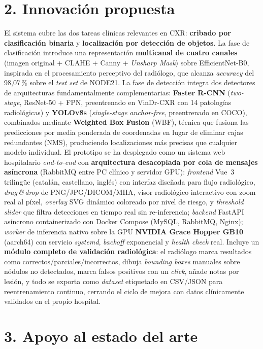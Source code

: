 \documentclass[11pt,a4paper]{article}
\begin{document}
\section*{2. Innovación propuesta}

El sistema cubre las dos tareas clínicas relevantes en CXR: \textbf{cribado por clasificación binaria} y \textbf{localización por detección de objetos}. La fase de clasificación introduce una representación \textbf{multicanal de cuatro canales} (imagen original + CLAHE + Canny + \emph{Unsharp Mask}) sobre EfficientNet-B0, inspirada en el procesamiento perceptivo del radiólogo, que alcanza \emph{accuracy} del 98{,}07\,\% sobre el \emph{test set} de NODE21. La fase de detección integra dos detectores de arquitecturas fundamentalmente complementarias: \textbf{Faster R-CNN} (\emph{two-stage}, ResNet-50 + FPN, preentrenado en VinDr-CXR con 14 patologías radiológicas) y \textbf{YOLOv8s} (\emph{single-stage} \emph{anchor-free}, preentrenado en COCO), combinados mediante \textbf{Weighted Box Fusion} (WBF), técnica que fusiona las predicciones por media ponderada de coordenadas en lugar de eliminar cajas redundantes (NMS), produciendo localizaciones más precisas que cualquier modelo individual. El prototipo se ha desplegado como un sistema web hospitalario \emph{end-to-end} con \textbf{arquitectura desacoplada por cola de mensajes asíncrona} (RabbitMQ entre PC clínico y servidor GPU): \emph{frontend} Vue~3 trilingüe (catalán, castellano, inglés) con interfaz diseñada para flujo radiológico, \emph{drag\,\&\,drop} de PNG/JPG/DICOM/MHA, visor radiológico interactivo con zoom real al píxel, \emph{overlay} SVG dinámico coloreado por nivel de riesgo, y \emph{threshold slider} que filtra detecciones en tiempo real sin re-inferencia; \emph{backend} FastAPI asíncrono containerizado con Docker Compose (MySQL, RabbitMQ, Nginx); \emph{worker} de inferencia nativo sobre la GPU \textbf{NVIDIA Grace Hopper GB10} (aarch64) con servicio \emph{systemd}, \emph{backoff} exponencial y \emph{health check} real. Incluye un \textbf{módulo completo de validación radiológica}: el radiólogo marca resultados como correctos/parciales/incorrectos, dibuja \emph{bounding boxes} manuales sobre nódulos no detectados, marca falsos positivos con un \emph{click}, añade notas por lesión, y todo se exporta como \emph{dataset} etiquetado en CSV/JSON para reentrenamiento continuo, cerrando el ciclo de mejora con datos clínicamente validados en el propio hospital.

\section*{3. Apoyo al estado del arte}
\end{document}
